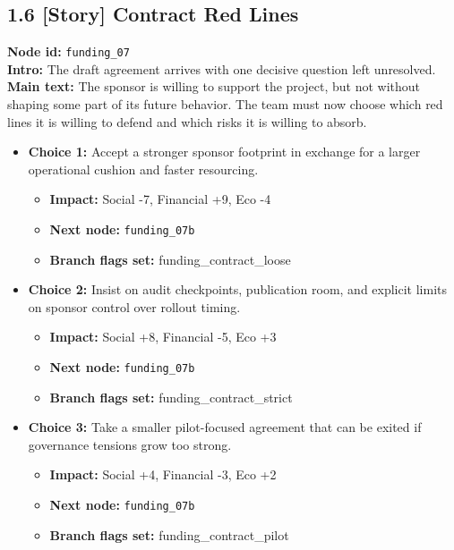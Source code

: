 \documentclass[11pt]{article}
\begin{document}
\subsection*{1.6 [Story] Contract Red Lines}
\textbf{Node id:} \texttt{funding\_07}\\
\textbf{Intro:} The draft agreement arrives with one decisive question left unresolved.\\
\textbf{Main text:} The sponsor is willing to support the project, but not without shaping some part of its future behavior. The team must now choose which red lines it is willing to defend and which risks it is willing to absorb.\\
\begin{itemize}
\item \textbf{Choice 1:} Accept a stronger sponsor footprint in exchange for a larger operational cushion and faster resourcing.
\begin{itemize}
\item \textbf{Impact:} Social -7, Financial +9, Eco -4
\item \textbf{Next node:} \texttt{funding\_07b}
\item \textbf{Branch flags set:} funding\_contract\_loose
\end{itemize}
\item \textbf{Choice 2:} Insist on audit checkpoints, publication room, and explicit limits on sponsor control over rollout timing.
\begin{itemize}
\item \textbf{Impact:} Social +8, Financial -5, Eco +3
\item \textbf{Next node:} \texttt{funding\_07b}
\item \textbf{Branch flags set:} funding\_contract\_strict
\end{itemize}
\item \textbf{Choice 3:} Take a smaller pilot-focused agreement that can be exited if governance tensions grow too strong.
\begin{itemize}
\item \textbf{Impact:} Social +4, Financial -3, Eco +2
\item \textbf{Next node:} \texttt{funding\_07b}
\item \textbf{Branch flags set:} funding\_contract\_pilot
\end{itemize}
\end{itemize}
\end{document}
